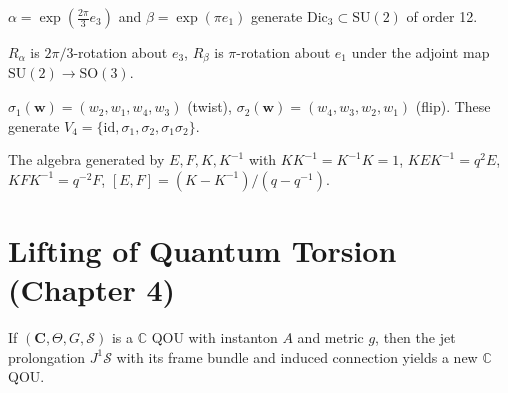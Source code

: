 \begin{definition}
  \label{def:su2-generators}
  $\alpha = \exp(\tfrac{2\pi}{3} e_3)$ and $\beta = \exp(\pi e_1)$
  generate $\mathrm{Dic}_3 \subset \mathrm{SU}(2)$ of order 12.
\end{definition}

\begin{definition}
  \label{def:so3-generators}
  $R_\alpha$ is $2\pi/3$-rotation about $e_3$,
  $R_\beta$ is $\pi$-rotation about $e_1$ under the adjoint map
  $\mathrm{SU}(2) \to \mathrm{SO}(3)$.
\end{definition}

\begin{definition}
  \label{def:braid-twist-flip}
  $\sigma_1(\mathbf{w}) = (w_2,w_1,w_4,w_3)$ (twist),
  $\sigma_2(\mathbf{w}) = (w_4,w_3,w_2,w_1)$ (flip).
  These generate $V_4 = \{\mathrm{id}, \sigma_1, \sigma_2, \sigma_1\sigma_2\}$.
\end{definition}

\begin{definition}
  \label{def:quantum-su2}
  The algebra generated by $E, F, K, K^{-1}$ with
  $KK^{-1} = K^{-1}K = 1$, $KEK^{-1} = q^2 E$,
  $KFK^{-1} = q^{-2} F$, $[E,F] = (K - K^{-1})/(q - q^{-1})$.
\end{definition}


\chapter{Lifting of Quantum Torsion (Chapter 4)}

\begin{proposition}
  \label{prop:jet-prolongation}
  If $(\mathbf{C}, \varTheta, G, \mathcal{S})$ is a $\mathbb{C}$ QOU with instanton $A$
  and metric $g$, then the jet prolongation $J^1 \mathcal{S}$ with its
  frame bundle and induced connection yields a new $\mathbb{C}$ QOU.
\end{proposition}

